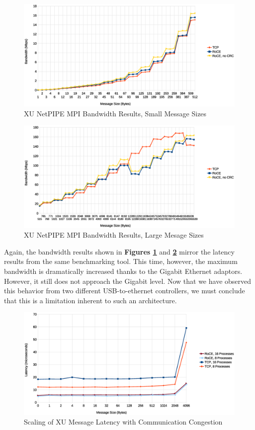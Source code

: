 \documentclass[11pt]{book}
\begin{document}
\begin{figure}[h]
\includegraphics[width=\textwidth]{xu_bw_small}
\caption{XU NetPIPE MPI Bandwidth Results, Small Message Sizes}
\label{xu-bw-small}
\end{figure}

\begin{figure}[h]
\includegraphics[width=\textwidth]{xu_bw_large}
\caption{XU NetPIPE MPI Bandwidth Results, Large Mesage Sizes}
\label{xu-bw-large}
\end{figure}

Again, the bandwidth results shown in \textbf{Figures \ref{xu-bw-small}} and
\textbf{\ref{xu-bw-large}} mirror the latency results from the same benchmarking
tool. This time, however, the maximum bandwidth is dramatically increased thanks
to the Gigabit Ethernet adaptors. However, it still does not approach the
Gigabit level. Now that we have observed this behavior from two different
USB-to-ethernet controllers, we must conclude that this is a limitation inherent
to such an architecture.

\begin{figure}[h]
\includegraphics[width=\textwidth]{xu_imb}
\caption{Scaling of XU Message Latency with Communication Congestion}
\label{xu-imb-low}
\end{figure}
\end{document}
